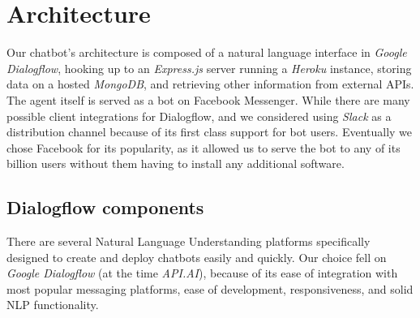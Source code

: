 \section{Architecture}
Our chatbot's architecture is composed of a natural language interface in \textit{Google Dialogflow}, hooking up to an \textit{Express.js} server running a \textit{Heroku} instance, storing data on a hosted \textit{MongoDB}, and retrieving other information from external APIs. \\
The agent itself is served as a bot on Facebook Messenger. While there are many possible client integrations for Dialogflow, and we considered using \textit{Slack} as a distribution channel because of its first class support for bot users. Eventually we chose Facebook for its popularity, as it allowed us to serve the bot to any of its billion users without them having to install any additional software.
\subsection{Dialogflow components}
There are several Natural Language Understanding platforms specifically designed to create and deploy chatbots easily and quickly. Our choice fell on \textit{Google Dialogflow} (at the time \textit{API.AI}), because of its ease of integration with most popular messaging platforms, ease of development, responsiveness, and solid NLP functionality. 

